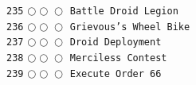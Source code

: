 \documentclass[a4paper,landscape]{article}
\begin{document}
\begin{multicols*}{5}
\texttt{235} \(\bigcirc\!\bigcirc\!\bigcirc\)  \texttt{Battle Droid Legion} \vspace{-0.3mm}\\ 
\texttt{236} \(\bigcirc\!\bigcirc\!\bigcirc\)  \texttt{Grievous's Wheel Bike} \vspace{-0.3mm}\\ 
\texttt{237} \(\bigcirc\!\bigcirc\!\bigcirc\)  \texttt{Droid Deployment} \vspace{-0.3mm}\\ 
\texttt{238} \(\bigcirc\!\bigcirc\!\bigcirc\)  \texttt{Merciless Contest} \vspace{-0.3mm}\\ 
\texttt{239} \(\bigcirc\!\bigcirc\!\bigcirc\)  \texttt{Execute Order 66} \vspace{-0.3mm}\\ 

\end{multicols*}
\end{document}
